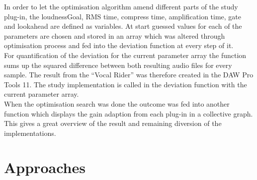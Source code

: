 In order to let the optimisation algorithm amend different parts of the study plug-in, the loudnessGoal, RMS time, compress time, amplification time, gate and lookahead are defined as variables. At start guessed values for each of the parameters are chosen and stored in an array which was altered through optimisation process and fed into the deviation function at every step of it.\\
For quantification of the deviation for the current parameter array the function sums up the squared difference between both resulting audio files for every sample. The result from the “Vocal Rider” was therefore created in the DAW Pro Tools 11. The study implementation is called in the deviation function with the current parameter array.\\
When the optimisation search was done the outcome was fed into another function which displays the gain adaption from each plug-in in a collective graph. This gives a great overview of the result and remaining diversion of the implementations.\\

\section{Approaches}

